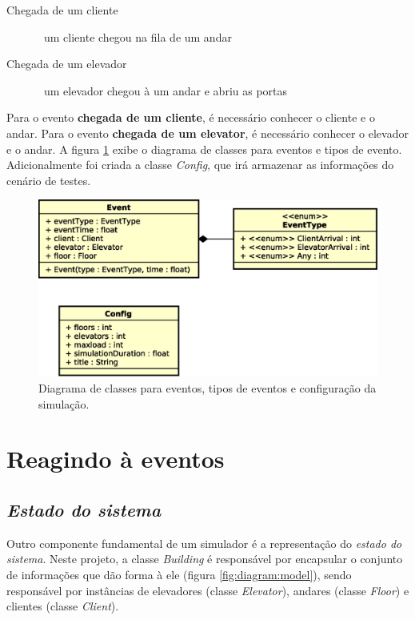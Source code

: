 \begin{description}
  \item[Chegada de um cliente] \hfill \ um cliente chegou na fila de um andar
  \item[Chegada de um elevador] \hfill \ um elevador chegou à um andar e abriu as portas
\end{description}

Para o evento \textbf{chegada de um cliente}, é necessário conhecer o cliente e
o andar. Para o evento \textbf{chegada de um elevator}, é necessário conhecer o
elevador e o andar. A figura \ref{fig:diagram:event} exibe o diagrama de classes
para eventos e tipos de evento. Adicionalmente foi criada a classe
\textit{Config}, que irá armazenar as informações do cenário de testes.

\begin{figure}[htb!]
  \centering
  \includegraphics[scale=0.6]{img/Basic.eps}
  \caption{Diagrama de classes para eventos, tipos de eventos e configuração da simulação.}
\label{fig:diagram:event}
\end{figure}

\section{Reagindo à eventos}

\subsection{\textit{Estado do sistema}}

Outro componente fundamental de um simulador é a representação do \textit{estado
do sistema}. Neste projeto, a classe \textit{Building} é responsável por
encapsular o conjunto de informações que dão forma à ele (figura
\ref{fig:diagram:model}), sendo responsável por instâncias de elevadores
(classe \textit{Elevator}), andares (classe \textit{Floor}) e clientes (classe
\textit{Client}).


